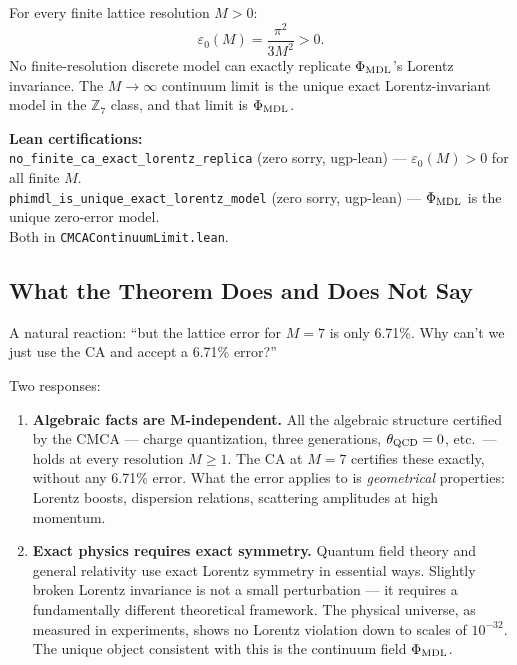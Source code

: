 \documentclass[11pt,a4paper]{article}
\newcommand{\lean}[1]{\texttt{#1}}
\newcommand{\PhiMDL}{\Phi_{\rm MDL}}
\newcommand{\ZS}{\mathbb{Z}_7}
\theoremstyle{definition}
\begin{document}
\begin{tcolorbox}[colback=boxred,colframe=red!50!black,
  title={Theorem: No-CA-Replica and $\PhiMDL$ Uniqueness (machine-certified)}]
For every finite lattice resolution $M > 0$:
\[
  \varepsilon_0(M) = \frac{\pi^2}{3M^2} > 0.
\]
No finite-resolution discrete model can exactly replicate $\PhiMDL$'s Lorentz
invariance.  The $M \to \infty$ continuum limit is the unique exact
Lorentz-invariant model in the $\ZS$ class, and that limit is $\PhiMDL$.

\smallskip\noindent
\textbf{Lean certifications:}\\
\lean{no\_finite\_ca\_exact\_lorentz\_replica} (zero sorry, ugp-lean) ---
$\varepsilon_0(M) > 0$ for all finite $M$.\\
\lean{phimdl\_is\_unique\_exact\_lorentz\_model} (zero sorry, ugp-lean) ---
$\PhiMDL$ is the unique zero-error model.\\
Both in \lean{CMCAContinuumLimit.lean}.
\end{tcolorbox}

\subsection{What the Theorem Does and Does Not Say}

A natural reaction: ``but the lattice error for $M = 7$ is only 6.71\%.  Why can't
we just use the CA and accept a 6.71\% error?''

Two responses:

\begin{enumerate}
  \item \textbf{Algebraic facts are M-independent.}
    All the algebraic structure certified by the CMCA --- charge quantization,
    three generations, $\theta_{\rm QCD} = 0$, etc.\ --- holds at every resolution
    $M \geq 1$.  The CA at $M = 7$ certifies these exactly, without any 6.71\%
    error.  What the error applies to is \emph{geometrical} properties: Lorentz
    boosts, dispersion relations, scattering amplitudes at high momentum.

  \item \textbf{Exact physics requires exact symmetry.}
    Quantum field theory and general relativity use exact Lorentz symmetry in
    essential ways.  Slightly broken Lorentz invariance is not a small perturbation
    --- it requires a fundamentally different theoretical framework.  The physical
    universe, as measured in experiments, shows no Lorentz violation down to scales
    of $10^{-32}$.  The unique object consistent with this is the continuum field
    $\PhiMDL$.
\end{enumerate}
\end{document}
